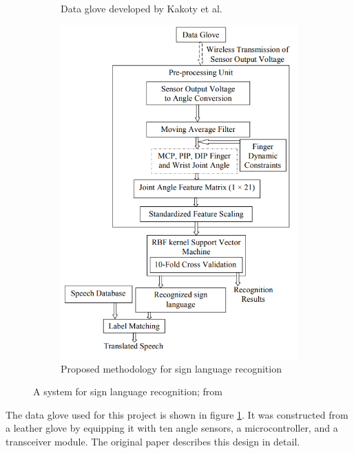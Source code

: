 \documentclass[hyperref, bachelorofscience]{cgvpub}
\begin{document}
\begin{figure}
\begin{subfigure}{.4\linewidth}
		\caption{Data glove developed by Kakoty et al.}
		\label{fig:kakoty_glove}
	\end{subfigure}
	\hfill
	\begin{subfigure}{.43\linewidth}
		\includegraphics[width=\linewidth]{../pics/kakoty_principle}
		\caption{Proposed methodology for sign language recognition}
		\label{fig:kakoty_principle}
	\end{subfigure}
	\caption[A system for sign language recognition]{A system for sign language recognition; from \cite{kakoty18}}
	\label{fig:kakoty}
\end{figure}

The data glove used for this project is shown in figure \ref{fig:kakoty_glove}. It was constructed from a leather glove by equipping it with ten angle sensors, a microcontroller, and a transceiver module. The original paper describes this design in detail.
\end{document}
